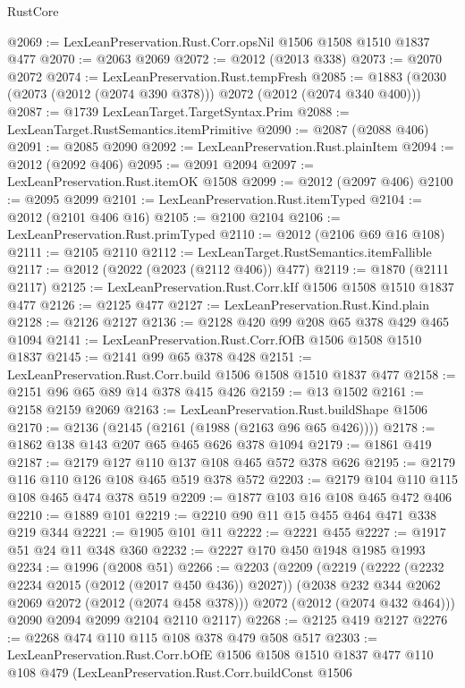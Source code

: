 \begin{lexlean}{RustCore}
\begin{coremodule}
@2069 := LexLeanPreservation.Rust.Corr.opsNil @1506 @1508 @1510 @1837 @477
@2070 := @2063 @2069
@2072 := @2012 (@2013 @338)
@2073 := @2070 @2072
@2074 := LexLeanPreservation.Rust.tempFresh
@2085 := @1883 (@2030 (@2073 (@2012 (@2074 @390 @378))) @2072 (@2012 (@2074 @340 @400)))
@2087 := @1739 LexLeanTarget.TargetSyntax.Prim
@2088 := LexLeanTarget.RustSemantics.itemPrimitive
@2090 := @2087 (@2088 @406)
@2091 := @2085 @2090
@2092 := LexLeanPreservation.Rust.plainItem
@2094 := @2012 (@2092 @406)
@2095 := @2091 @2094
@2097 := LexLeanPreservation.Rust.itemOK @1508
@2099 := @2012 (@2097 @406)
@2100 := @2095 @2099
@2101 := LexLeanPreservation.Rust.itemTyped
@2104 := @2012 (@2101 @406 @16)
@2105 := @2100 @2104
@2106 := LexLeanPreservation.Rust.primTyped
@2110 := @2012 (@2106 @69 @16 @108)
@2111 := @2105 @2110
@2112 := LexLeanTarget.RustSemantics.itemFallible
@2117 := @2012 (@2022 (@2023 (@2112 @406)) @477)
@2119 := @1870 (@2111 @2117)
@2125 := LexLeanPreservation.Rust.Corr.kIf @1506 @1508 @1510 @1837 @477
@2126 := @2125 @477
@2127 := LexLeanPreservation.Rust.Kind.plain
@2128 := @2126 @2127
@2136 := @2128 @420 @99 @208 @65 @378 @429 @465 @1094
@2141 := LexLeanPreservation.Rust.Corr.fOfB @1506 @1508 @1510 @1837
@2145 := @2141 @99 @65 @378 @428
@2151 := LexLeanPreservation.Rust.Corr.build @1506 @1508 @1510 @1837 @477
@2158 := @2151 @96 @65 @89 @14 @378 @415 @426
@2159 := @13 @1502
@2161 := @2158 @2159 @2069
@2163 := LexLeanPreservation.Rust.buildShape @1506
@2170 := @2136 (@2145 (@2161 (@1988 (@2163 @96 @65 @426))))
@2178 := @1862 @138 @143 @207 @65 @465 @626 @378 @1094
@2179 := @1861 @419
@2187 := @2179 @127 @110 @137 @108 @465 @572 @378 @626
@2195 := @2179 @116 @110 @126 @108 @465 @519 @378 @572
@2203 := @2179 @104 @110 @115 @108 @465 @474 @378 @519
@2209 := @1877 @103 @16 @108 @465 @472 @406
@2210 := @1889 @101
@2219 := @2210 @90 @11 @15 @455 @464 @471 @338 @219 @344
@2221 := @1905 @101 @11
@2222 := @2221 @455
@2227 := @1917 @51 @24 @11 @348 @360
@2232 := @2227 @170 @450 @1948 @1985 @1993
@2234 := @1996 (@2008 @51)
@2266 := @2203
    (@2209
      (@2219
        (@2222 (@2232 @2234 @2015 (@2012 (@2017 @450 @436)) @2027))
        (@2038 @232 @344 @2062 @2069 @2072 (@2012 (@2074 @458 @378)))
        @2072
        (@2012 (@2074 @432 @464)))
      @2090
      @2094
      @2099
      @2104
      @2110
      @2117)
@2268 := @2125 @419 @2127
@2276 := @2268 @474 @110 @115 @108 @378 @479 @508 @517
@2303 := LexLeanPreservation.Rust.Corr.bOfE
    @1506
    @1508
    @1510
    @1837
    @477
    @110
    @108
    @479
    (LexLeanPreservation.Rust.Corr.buildConst
      @1506

\end{coremodule}
\end{lexlean}
